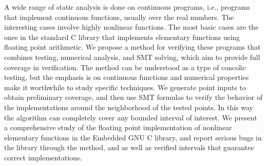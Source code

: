 A wide range of static analysis is done on continuous programs, i.e., programs that implement continuous functions, usually over the real numbers. The interesting cases involve highly nonlinear functions. The
most basic cases are the ones in the standard C library that
implements elementary functions using floating point arithmetic. We
propose a method for verifying these programs that combines testing,
numerical analysis, and SMT solving, which aim to provide full
coverage in verification. The method can be understood as a type of
concolic testing, but the emphasis is on continuous functions and
numerical properties make it worthwhile to study specific techniques.
We generate point inputs to obtain preliminary coverage, and then use
SMT formulas to verify the behavior of the implementations around the
neighborhood of the tested points. In this way the algorithm can
completely cover any bounded interval of interest. We present a
comprehensive study of the floating point implementation of nonlinear
elementary functions in the Embedded GNU C library, and report serious
bugs in the library through the method, and as well as verified
intervals that guarantee correct implementations.

